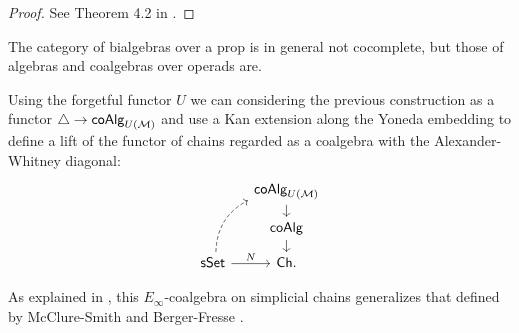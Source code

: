 \begin{proof}
	See Theorem 4.2 in \cite{Medina20prop1}.
\end{proof}

The category of bialgebras over a prop is in general not cocomplete, but those of algebras and coalgebras over operads are.

Using the forgetful functor $U$ we can considering the previous construction as a functor $\triangle \to \mathsf{coAlg}_{U(\mathcal{M})}$ and use a Kan extension along the Yoneda embedding to define a lift of the functor of chains regarded as a coalgebra with the Alexander-Whitney diagonal:
\begin{equation*}
\begin{tikzcd}[column sep=small, row sep=small]
& \coAlg_{U(\M)} \arrow[d] \\
& \coAlg \arrow[d] \\
\sSet \arrow[r, "N"] \arrow[dashed, uur, bend left]& \Ch.
\end{tikzcd}
\end{equation*}

As explained in \cite{Medina20prop1}, this $E_\infty$-coalgebra on simplicial chains generalizes that defined by McClure-Smith \cite{mcclure03cochain} and Berger-Fresse \cite{berger04combinatorial}.